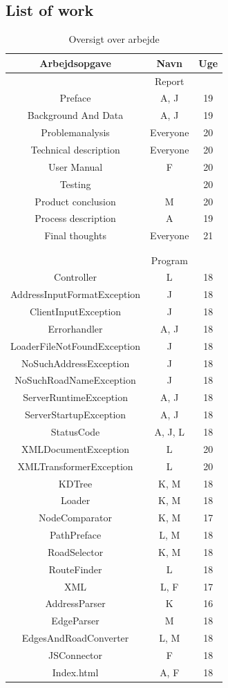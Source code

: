 \documentclass[a4paper,10pt,titlepage]{article}
\begin{document}
	\subsection{List of work}
	\begin{table}[!htb]
\caption{Oversigt over arbejde}
\centering
\begin{tabular}{c c c}
Arbejdsopgave & Navn & Uge \\ [1.5ex] 
\hline
   & Report &  \\
Preface & A, J & 19 \\
Background And Data & A, J & 19 \\
Problemanalysis & Everyone & 20\\
Technical description & Everyone & 20 \\
User Manual & F & 20 \\
Testing &  & 20 \\
Product conclusion & M & 20\\
Process description & A & 19\\
Final thoughts & Everyone & 21\\
\\
\\
  & Program &  \\
Controller & L & 18 \\
AddressInputFormatException & J & 18 \\
ClientInputException & J & 18 \\
Errorhandler & A, J & 18 \\
LoaderFileNotFoundException & J & 18 \\
NoSuchAddressException & J & 18 \\
NoSuchRoadNameException & J & 18 \\
ServerRuntimeException & A, J & 18 \\
ServerStartupException & A, J & 18 \\
StatusCode & A, J, L & 18 \\
XMLDocumentException & L & 20 \\
XMLTransformerException & L & 20 \\
KDTree & K, M & 18 \\
Loader & K, M & 18 \\
NodeComparator & K, M & 17 \\
PathPreface & L, M & 18 \\
RoadSelector & K, M & 18 \\
RouteFinder & L & 18 \\
XML	& L, F & 17 \\
AddressParser & K & 16 \\
EdgeParser & M & 18 \\
EdgesAndRoadConverter & L, M & 18 \\
JSConnector & F & 18 \\
Index.html & A, F & 18 \\

\end{tabular}
\end{table}
\end{document}
